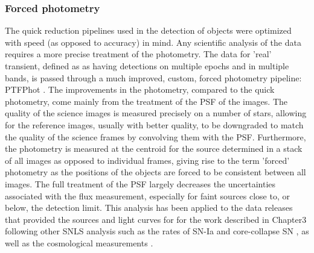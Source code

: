 \subsubsection{Forced photometry}
The quick reduction pipelines used in the detection of objects were optimized with speed (as opposed to accuracy) in mind. Any scientific analysis of the data requires a more precise treatment of the photometry. The data for 'real' transient, defined as as having detections on multiple epochs and in multiple bands, is passed through a much improved, custom, forced photometry pipeline: PTFPhot \citep{Firth2015}. The improvements in the photometry, compared to the quick photometry, come mainly from the treatment of the PSF of the images. The quality of the science images is measured precisely on a number of stars, allowing for the reference images, usually with better quality, to be downgraded to match the quality of the science frames by convolving them with the PSF. Furthermore, the photometry is measured at the centroid for the source determined in a stack of all images as opposed to individual frames, giving rise to the term 'forced' photometry as the positions of the objects are forced to be consistent between all images. The full treatment of the PSF largely decreases the uncertainties associated with the flux measurement, especially for faint sources close to, or below, the detection limit. This analysis has been applied to the data releases that provided the sources and light curves for for the work described in {Chapter3} following other SNLS analysis such as the rates of SN-Ia \citep{Perrett2012} and core-collapse SN \citep{Bazin2009}, as well as the cosmological measurements \citep{Astier2006,Sullivan2011}.

